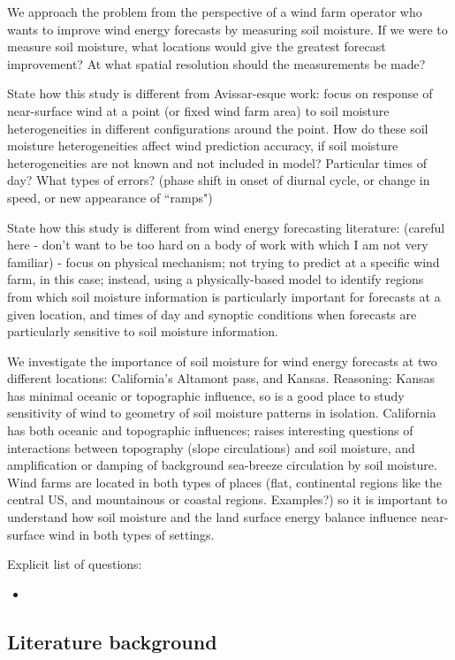 \documentclass[12pt]{amsart}
\begin{document}
We approach the problem from the perspective of a wind farm operator who wants to improve wind energy forecasts by measuring soil moisture.  If we were to measure soil moisture, what locations would give the greatest forecast improvement?  At what spatial resolution should the measurements be made?

State how this study is different from Avissar-esque work: focus on response of near-surface wind at a point (or fixed wind farm area) to soil moisture heterogeneities in different configurations around the point.  How do these soil moisture heterogeneities affect wind prediction accuracy, if soil moisture heterogeneities are not known and not included in model?  Particular times of day?  What types of errors?  (phase shift in onset of diurnal cycle, or change in speed, or new appearance of ``ramps")

State how this study is different from wind energy forecasting literature: (careful here - don't want to be too hard on a body of work with which I am not very familiar) - focus on physical mechanism; not trying to predict at a specific wind farm, in this case; instead, using a physically-based model to identify regions from which soil moisture information is particularly important for forecasts at a given location, and times of day and synoptic conditions when forecasts are particularly sensitive to soil moisture information.

We investigate the importance of soil moisture for wind energy forecasts at two different locations: California's Altamont pass, and Kansas.  Reasoning: Kansas has minimal oceanic or topographic influence, so is a good place to study sensitivity of wind to geometry of soil moisture patterns in isolation.  California has both oceanic and topographic influences; raises interesting questions of interactions between topography (slope circulations) and soil moisture, and amplification or damping of background sea-breeze circulation by soil moisture.  Wind farms are located in both types of places (flat, continental regions like the central US, and mountainous or coastal regions. Examples?) so it is important to understand how soil moisture and the land surface energy balance influence near-surface wind in both types of settings.

Explicit list of questions:
\begin{itemize}
\item 
\end{itemize}


\subsection{Literature background}
\end{document}
